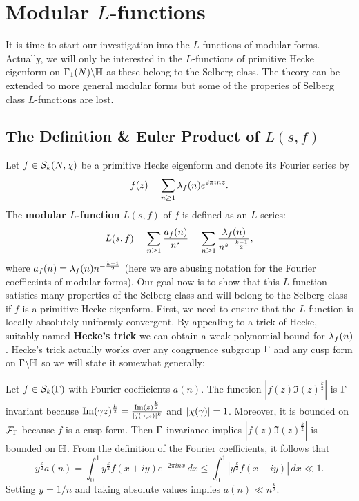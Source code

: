   \section{Modular \texorpdfstring{$L$}{L}-functions}
    It is time to start our investigation into the $L$-functions of modular forms. Actually, we will only be interested in the $L$-functions of primitive Hecke eigenform on $\Gamma_{1}(N)\backslash\mathbb{H}$ as these belong to the Selberg class. The theory can be extended to more general modular forms but some of the properies of Selberg class $L$-functions are lost.
    \subsection*{The Definition \& Euler Product of \texorpdfstring{$L(s,f)$}{L(s,f)}}
      Let $f \in \mathcal{S}_{k}(N,\chi)$ be a primitive Hecke eigenform and denote its Fourier series by
      \[
        f(z) = \sum_{n \ge 1}\lambda_{f}(n)e^{2\pi inz}.
      \]
      The \textbf{modular $L$-function} $L(s,f)$ of $f$ is defined as an $L$-series:
      \[
        L(s,f) = \sum_{n \ge 1}\frac{a_{f}(n)}{n^{s}} = \sum_{n \ge 1}\frac{\lambda_{f}(n)}{n^{s+\frac{k-1}{2}}},
      \]
      where $a_{f}(n) = \lambda_{f}(n)n^{-\frac{k-1}{2}}$ (here we are abusing notation for the Fourier coefficeints of modular forms). Our goal now is to show that this $L$-function satisfies many properties of the Selberg class and will belong to the Selberg class if $f$ is a primitive Hecke eigenform. First, we need to ensure that the $L$-function is locally absolutely uniformly convergent. By appealing to a trick of Hecke, suitably named \textbf{Hecke's trick} we can obtain a weak polynomial bound for $\lambda_{f}(n)$. Hecke's trick actually works over any congruence subgroup $\Gamma$ and any cusp form on $\Gamma\backslash\mathbb{H}$ so we will state it somewhat generally:

      \begin{method}
        Let $f \in \mathcal{S}_{k}(\Gamma)$ with Fourier coefficients $a(n)$. The function $\left|f(z)\Im(z)^{\frac{k}{2}}\right|$ is $\Gamma$-invariant because $\mathrm{Im}(\gamma z)^{\frac{k}{2}} = \frac{\mathrm{Im}(z)^{\frac{k}{2}}}{|j(\gamma,z)|^{k}}$ and $|\chi(\gamma)| = 1$. Moreover, it is bounded on $\mathcal{F}_{\Gamma}$ because $f$ is a cusp form. Then $\Gamma$-invariance implies $\left|f(z)\Im(z)^{\frac{k}{2}}\right|$ is bounded on $\mathbb{H}$. From the definition of the Fourier coefficients, it follows that
        \[
          y^{\frac{k}{2}}a(n) = \int_{0}^{1}y^{\frac{k}{2}}f(x+iy)e^{-2\pi inx}\,dx \le \int_{0}^{1}\left|y^{\frac{k}{2}}f(x+iy)\right|\,dx \ll 1.
        \]
        Setting $y = 1/n$ and taking absolute values implies $a(n) \ll n^{\frac{k}{2}}$.
      \end{method}

